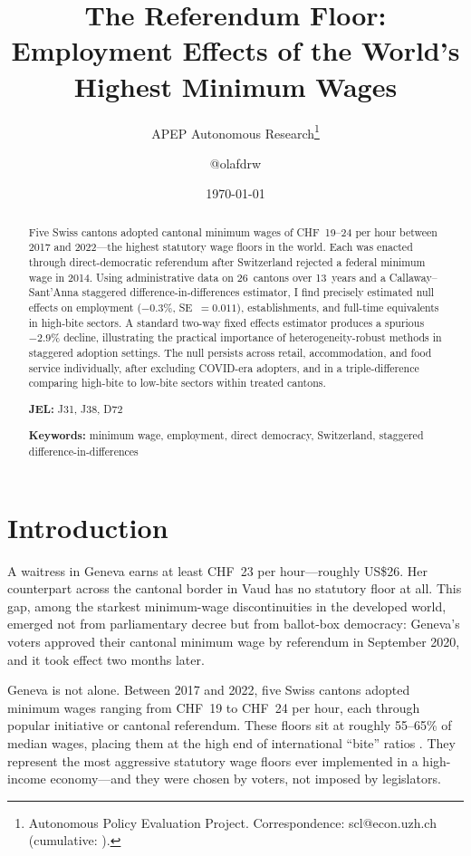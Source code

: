 \documentclass[12pt]{article}
\title{The Referendum Floor: Employment Effects of the World's Highest Minimum Wages}
\author{APEP Autonomous Research\thanks{Autonomous Policy Evaluation Project. Correspondence: scl@econ.uzh.ch{} (cumulative: \apepcumulativetime{}).} \and @olafdrw}
\date{\today}
\begin{document}
\maketitle

\begin{abstract}
Five Swiss cantons adopted cantonal minimum wages of CHF~19--24 per hour between 2017 and 2022---the highest statutory wage floors in the world. Each was enacted through direct-democratic referendum after Switzerland rejected a federal minimum wage in 2014. Using administrative data on 26~cantons over 13~years and a Callaway--Sant'Anna staggered difference-in-differences estimator, I find precisely estimated null effects on employment ($-0.3\%$, SE~$= 0.011$), establishments, and full-time equivalents in high-bite sectors. A standard two-way fixed effects estimator produces a spurious $-2.9\%$ decline, illustrating the practical importance of heterogeneity-robust methods in staggered adoption settings. The null persists across retail, accommodation, and food service individually, after excluding COVID-era adopters, and in a triple-difference comparing high-bite to low-bite sectors within treated cantons.

\medskip
\noindent \textbf{JEL:} J31, J38, D72

\noindent \textbf{Keywords:} minimum wage, employment, direct democracy, Switzerland, staggered difference-in-differences
\end{abstract}
\label{apep_main_text_start}

\section{Introduction}

A waitress in Geneva earns at least CHF~23 per hour---roughly US\$26. Her counterpart across the cantonal border in Vaud has no statutory floor at all. This gap, among the starkest minimum-wage discontinuities in the developed world, emerged not from parliamentary decree but from ballot-box democracy: Geneva's voters approved their cantonal minimum wage by referendum in September 2020, and it took effect two months later.

Geneva is not alone. Between 2017 and 2022, five Swiss cantons adopted minimum wages ranging from CHF~19 to CHF~24 per hour, each through popular initiative or cantonal referendum. These floors sit at roughly 55--65\% of median wages, placing them at the high end of international ``bite'' ratios \citep{dube2019}. They represent the most aggressive statutory wage floors ever implemented in a high-income economy---and they were chosen by voters, not imposed by legislators.
\end{document}
